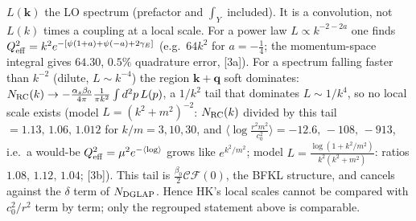 \begin{itemize}
$L(\boldsymbol k)$ the LO spectrum (prefactor and $\int_{Y}$ included). It is a convolution, not $L(k)$ times a coupling at a local scale. For a power law $L\propto k^{-2-2a}$ one finds $Q_{\rm eff}^{2}=k^{2}e^{-[\psi(1+a)+\psi(-a)+2\gamma_{E}]}$ (e.g.\ $64k^{2}$ for $a=-\frac14$; the momentum-space integral gives $64.30$, $0.5\%$ quadrature error, [3a]). For a spectrum falling faster than $k^{-2}$ (dilute, $L\sim k^{-4}$) the region $\boldsymbol k+\boldsymbol q$ soft dominates: $N_{\rm RC}(k)\to-\frac{\alpha_{s}\beta_{0}}{4\pi}\frac{1}{\pi k^{2}}\int d^{2}p\,L(p)$, a $1/k^{2}$ tail that dominates $L\sim1/k^{4}$, so no local scale exists (model $L=(k^{2}+m^{2})^{-2}$: $N_{\rm RC}(k)$ divided by this tail $=1.13,\,1.06,\,1.012$ for $k/m=3,10,30$, and $\langle\log\frac{r^{2}m^{2}}{c_{0}^{2}}\rangle=-12.6,\,-108,\,-913$, i.e.\ a would-be $Q_{\rm eff}^{2}=\mu^{2}e^{-\langle\log\rangle}$ grows like $e^{k^{2}/m^{2}}$; model $L=\frac{\log(1+k^{2}/m^{2})}{k^{2}(k^{2}+m^{2})}$: ratios $1.08,\,1.12,\,1.04$; [3b]). This tail is $\frac{\beta_{0}}{2}\mathcal{C}\mathcal{F}(0)$, the BFKL structure, and cancels against the $\delta$ term of $N_{\rm DGLAP}$. Hence HK's local scales cannot be compared with $c_{0}^{2}/r^{2}$ term by term; only the regrouped statement above is comparable.
\end{itemize}

